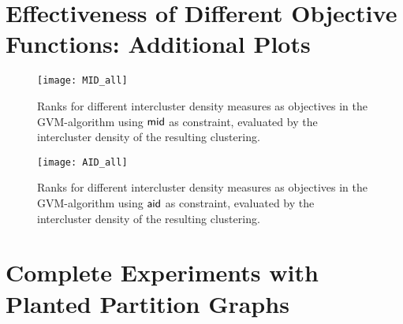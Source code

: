 \documentclass{llncs}
\newcommand{\measure}[1]{\ensuremath{\text{\normalfont{\sffamily {#1}}}}\xspace}
\begin{document}
\clearpage

\section{Effectiveness of Different Objective Functions: Additional Plots}

\label{app:add_effectiveness}
\begin{figure}[b]
 	\centerline{\texttt{[image: MID\_all]}}
 	\caption{Ranks for different intercluster density measures as objectives in the GVM-algorithm using \measure{mid} as constraint, evaluated by the intercluster density of the resulting clustering.}
 	\label{fig:mid}
\end{figure}

\begin{figure}[b]
 	\centerline{\texttt{[image: AID\_all]}}
 	\caption{Ranks for different intercluster density measures as objectives in the GVM-algorithm using \measure{aid} as constraint, evaluated by the intercluster density of the resulting clustering.}
 	\label{fig:aid}
\end{figure}

\clearpage

\section{Complete Experiments with Planted Partition Graphs}
\label{sec:Gnp_add}
\begin{figure}[htbp]
  \hfill \vspace{0.0cm}
  \hfill \vspace{0.0cm}
  \hfill \vspace{0.0cm}
  \end{figure}
\end{document}

